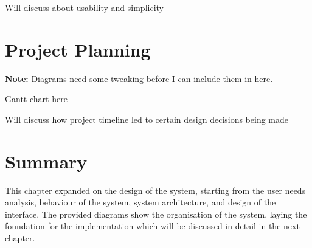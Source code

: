 Will discuss about usability and simplicity

\section{Project Planning} %
\textbf{Note:} Diagrams need some tweaking before I can include them in here.

Gantt chart here

Will discuss how project timeline led to certain design decisions being made

\section{Summary} %
This chapter expanded on the design of the system, starting from the user needs analysis, behaviour of the system, system architecture, and design of the interface. The provided diagrams show the organisation of the system, laying the foundation for the implementation which will be discussed in detail in the next chapter.

